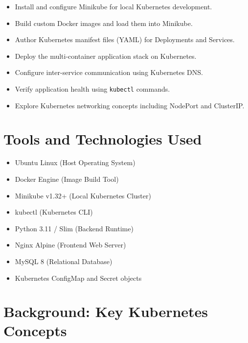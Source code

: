 \documentclass[12pt,a4paper]{article}
\begin{document}
\begin{itemize}
  \item Install and configure Minikube for local Kubernetes development.
  \item Build custom Docker images and load them into Minikube.
  \item Author Kubernetes manifest files (YAML) for Deployments and Services.
  \item Deploy the multi-container application stack on Kubernetes.
  \item Configure inter-service communication using Kubernetes DNS.
  \item Verify application health using \texttt{kubectl} commands.
  \item Explore Kubernetes networking concepts including NodePort and ClusterIP.
\end{itemize}

\section{Tools and Technologies Used}

\begin{itemize}
  \item Ubuntu Linux (Host Operating System)
  \item Docker Engine (Image Build Tool)
  \item Minikube v1.32+ (Local Kubernetes Cluster)
  \item kubectl (Kubernetes CLI)
    \item Python 3.11 / Slim (Backend Runtime)
  \item Nginx Alpine (Frontend Web Server)
  \item MySQL 8 (Relational Database)
    \item Kubernetes ConfigMap and Secret objects
\end{itemize}

\section{Background: Key Kubernetes Concepts}
\end{document}
